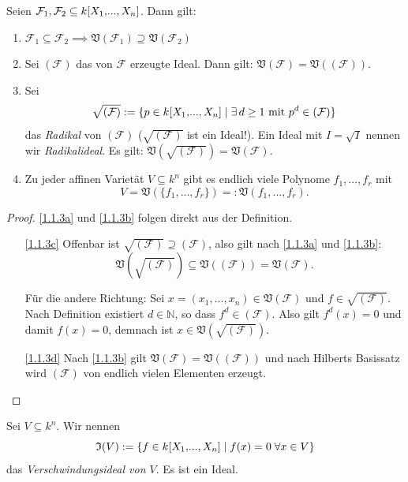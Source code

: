 \documentclass[a4paper,12pt,index=toc]{scrbook}
\theoremstyle{keinenummern} %
\def\V{\mathfrak{V}}
\def\I{\mathfrak{I}}
\newcommand{\F}{\mathcal{F}}
\renewcommand{\dotsc}{\ensuremath{\!...}}
\newcommand{\set}[1]{\ensuremath{\mathbb{#1}}}
\newcommand{\N}{\set{N}}
\newcommand{\polyx}[1][n]{\ensuremath%
  [X_{1},\dotsc,X_{#1}]}
\begin{document}
\begin{bem}\label{1.1.3} Seien $\F_{1},\F_{2}\subseteq k\polyx$. Dann gilt:
\begin{enumerate}
\item{} $\F_{1}\subseteq\F_{2}\implies \V(\F_{1})\supseteq \V(\F_{2})$
\item{} Sei $(\F)$ das von $\F$ erzeugte Ideal. Dann gilt: $\V(\F) = \V((\F))$.
\item{} Sei
\begin{equation*}\sqrt{(\F)}:=\{p\in k\polyx\mid\exists\, d\geq 1\text{ mit }p^{d}\in(\F)\}\end{equation*}
das \emph{Radikal} von $(\F)$ ($\sqrt{(\F)}$ ist ein Ideal!). Ein Ideal mit $I=\sqrt{I}$ nennen wir \emph{Radikalideal}. Es gilt: $\V(\sqrt{(\F)})=\V(\F)$.
\item{} Zu jeder affinen Varietät $V\subseteq k^{n}$ gibt es endlich viele Polynome $f_{1},\dotsc,f_{r}$ mit \begin{equation*}V=\V(\{f_{1},\dotsc,f_{r}\})=:\V(f_{1},\dotsc,f_{r}).\end{equation*}
\end{enumerate}
\end{bem}

\begin{proof}\mbox{} %
\ref{1.1.3a} und \ref{1.1.3b} folgen direkt aus der Definition.
\begin{enumerate}%
\item[\ref{1.1.3c}] Offenbar ist $\sqrt{(\F)}\supseteq(\F)$, also gilt nach \ref{1.1.3a} und \ref{1.1.3b}: 
\begin{equation*}\V(\sqrt{(\F)})\subseteq \V((\F))=\V(\F).\end{equation*}

Für die andere Richtung: Sei $x=(x_{1},\dotsc,x_{n})\in \V(\F)$ und $f\in\sqrt{(\F)}$. Nach Definition existiert $d\in\N$, so dass $f^{d}\in(\F)$. Also gilt $f^{d}(x)=0$ und damit $f(x)=0$, demnach ist $x\in \V(\sqrt{(\F)})$.
\item[\ref{1.1.3d}] Nach \ref{1.1.3b} gilt $\V(\F)=\V((\F))$ und nach Hilberts Basissatz wird $(\F)$ von endlich vielen Elementen erzeugt.
\end{enumerate}
\end{proof}

\begin{db}
Sei $V\subseteq k^{n}$. Wir nennen
\begin{equation*}\I(V):=\{f\in k\polyx\mid f(x)=0\;\forall x\in V\}\end{equation*}
das \emph{Verschwindungsideal von $V$}. Es ist ein Ideal.
\end{db}
\end{document}
